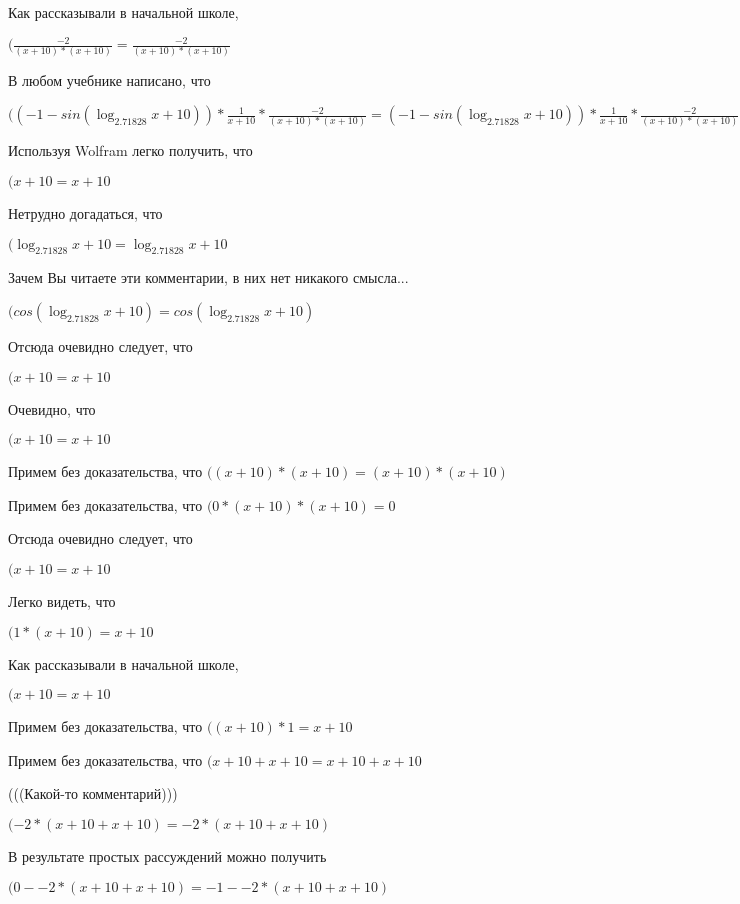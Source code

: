 \documentclass[12pt,a4paper,fleqn]{article}
\theoremstyle{definition}
\begin{document}
Как рассказывали в начальной школе,

$(\frac{ -2 }{( x  +  10 ) * ( x  +  10 )}
 = \frac{ -2 }{( x  +  10 ) * ( x  +  10 )}
$

В любом учебнике написано, что

$(( -1  - sin(\log_{ 2.71828 }{ x  +  10 })) * \frac{ 1 }{ x  +  10 }
 * \frac{ -2 }{( x  +  10 ) * ( x  +  10 )}
 = ( -1  - sin(\log_{ 2.71828 }{ x  +  10 })) * \frac{ 1 }{ x  +  10 }
 * \frac{ -2 }{( x  +  10 ) * ( x  +  10 )}
$

Используя Wolfram легко получить, что

$( x  +  10  =  x  +  10 $

Нетрудно догадаться, что

$(\log_{ 2.71828 }{ x  +  10 } = \log_{ 2.71828 }{ x  +  10 }$

Зачем Вы читаете эти комментарии, в них нет никакого смысла...

$(cos(\log_{ 2.71828 }{ x  +  10 }) = cos(\log_{ 2.71828 }{ x  +  10 })$

Отсюда очевидно следует, что

$( x  +  10  =  x  +  10 $

Очевидно, что

$( x  +  10  =  x  +  10 $

Примем без доказательства, что
$(( x  +  10 ) * ( x  +  10 ) = ( x  +  10 ) * ( x  +  10 )$

Примем без доказательства, что
$( 0  * ( x  +  10 ) * ( x  +  10 ) =  0 $

Отсюда очевидно следует, что

$( x  +  10  =  x  +  10 $

Легко видеть, что

$( 1  * ( x  +  10 ) =  x  +  10 $

Как рассказывали в начальной школе,

$( x  +  10  =  x  +  10 $

Примем без доказательства, что
$(( x  +  10 ) *  1  =  x  +  10 $

Примем без доказательства, что
$( x  +  10  +  x  +  10  =  x  +  10  +  x  +  10 $

(((Какой-то комментарий)))

$( -2  * ( x  +  10  +  x  +  10 ) =  -2  * ( x  +  10  +  x  +  10 )$

В результате простых рассуждений можно получить

$( 0  -  -2  * ( x  +  10  +  x  +  10 ) =  -1  -  -2  * ( x  +  10  +  x  +  10 )$
\end{document}
